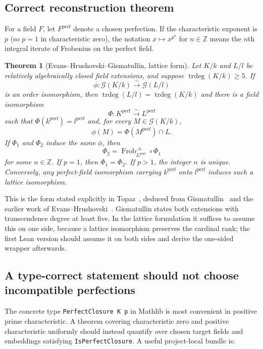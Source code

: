 \documentclass[11pt,oneside]{article}
\newtheorem{theorem}{Theorem}[section]
\theoremstyle{definition}
\theoremstyle{remark}
\newcommand{\trdeg}{\operatorname{trdeg}}
\newcommand{\Frob}{\operatorname{Frob}}
\newcommand{\G}{\mathcal{G}}
\newcommand{\lean}[1]{\nolinkurl{#1}}
\begin{document}
\subsection{Correct reconstruction theorem}

For a field $F$, let $F^{\mathrm{perf}}$ denote a chosen perfection.  If the characteristic
exponent is $p$ (so $p=1$ in characteristic zero), the notation $x\mapsto x^{p^n}$ for
$n\in\mathbb Z$ means the $n$th integral iterate of Frobenius on the perfect field.

\begin{theorem}[Evans--Hrushovski--Gismatullin, lattice form]\label{thm:target}
Let $K/k$ and $L/l$ be relatively algebraically closed field extensions, and suppose
$\trdeg(K/k)\geq5$.  If
\[
  \phi:\G(K/k)\overset{\sim}{\longrightarrow}\G(L/l)
\]
is an order isomorphism, then $\trdeg(L/l)=\trdeg(K/k)$ and there is a field isomorphism
\[
  \Phi:K^{\mathrm{perf}}\overset{\sim}{\longrightarrow}L^{\mathrm{perf}}
\]
such that $\Phi(k^{\mathrm{perf}})=l^{\mathrm{perf}}$ and, for every
$M\in\G(K/k)$,
\[
  \phi(M)=\Phi(M^{\mathrm{perf}})\cap L.
\]
If $\Phi_1$ and $\Phi_2$ induce the same $\phi$, then
\[
  \Phi_2=\Frob_{L^{\mathrm{perf}}}^{,n}\circ\Phi_1
\]
for some $n\in\mathbb Z$.  If $p=1$, then $\Phi_1=\Phi_2$.  If $p>1$, the integer $n$
is unique.  Conversely, any perfect-field isomorphism carrying $k^{\mathrm{perf}}$ onto
$l^{\mathrm{perf}}$ induces such a lattice isomorphism.
\end{theorem}

This is the form stated explicitly in Topaz~\cite[Theorem 4.4]{Topaz2022}, deduced from
Gismatullin~\cite[Theorem 4.2]{Gismatullin2008} and the earlier work of
Evans--Hrushovski~\cite{EH1991,EH1995}.  Gismatullin states both extensions with
transcendence degree at least five.  In the lattice formulation it suffices to assume this
on one side, because a lattice isomorphism preserves the cardinal rank; the first Lean
version should assume it on both sides and derive the one-sided wrapper afterwards.

\subsection{A type-correct statement should not choose incompatible perfections}

The concrete type \lean{PerfectClosure K p} in Mathlib is most convenient in positive
prime characteristic.  A theorem covering characteristic zero and positive characteristic
uniformly should instead quantify over chosen target fields and embeddings satisfying
\lean{IsPerfectClosure}.  A useful project-local bundle is:
\end{document}

